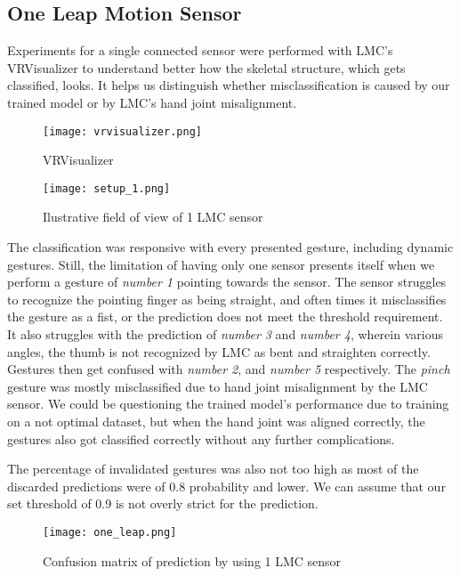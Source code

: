 \subsection{One Leap Motion Sensor}

Experiments for a single connected sensor were performed with LMC's VRVisualizer to understand better how the skeletal structure, which gets classified, looks. It helps us distinguish whether misclassification is caused by our trained model or by LMC's hand joint misalignment.

\begin{figure}[ht]
    \centering
    \texttt{[image: vrvisualizer.png]}
    \caption{VRVisualizer}
    \label{fig:vrvisualizer}
\end{figure}

\begin{figure}[ht]
    \centering
    \texttt{[image: setup\_1.png]}
    \caption{Ilustrative field of view of 1 LMC sensor}
    \label{fig:setup_1}
\end{figure}


The classification was responsive with every presented gesture, including dynamic gestures. Still, the limitation of having only one sensor presents itself when we perform a gesture of \textit{number 1} pointing towards the sensor. The sensor struggles to recognize the pointing finger as being straight, and often times it misclassifies the gesture as a fist, or the prediction does not meet the threshold requirement. It also struggles with the prediction of \textit{number 3} and \textit{number 4}, wherein various angles, the thumb is not recognized by LMC as bent and straighten correctly. Gestures then get confused with \textit{number 2}, and \textit{number 5} respectively. The \textit{pinch} gesture was mostly misclassified due to hand joint misalignment by the LMC sensor. We could be questioning the trained model's performance due to training on a not optimal dataset, but when the hand joint was aligned correctly, the gestures also got classified correctly without any further complications.

The percentage of invalidated gestures was also not too high as most of the discarded predictions were of 0.8 probability and lower. We can assume that our set threshold of 0.9 is not overly strict for the prediction.

\begin{figure}[ht]
    \centering
    \texttt{[image: one\_leap.png]}
    \caption{Confusion matrix of prediction by using 1 LMC sensor}
    \label{fig:confuse_1}
\end{figure}


